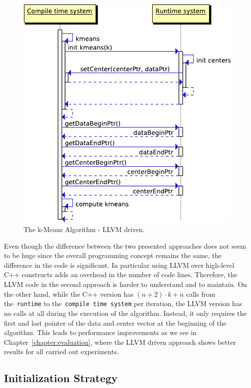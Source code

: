 \begin{figure}[htsb]
  \centering
  \includegraphics[scale=0.55]{figures/llvm_driven}
  \caption[The k-Means Algorithm - LLVM driven]{The k-Means Algorithm - LLVM driven.}
  \label{fig:llvm_driven}
\end{figure}



Even though the difference between the two presented approaches does not seem to be huge since the overall programming concept remains the same, the difference in the code is significant. In particular using LLVM over high-level C++ constructs adds an overhead in the number of code lines. Therefore, the LLVM code in the second approach is harder to understand and to maintain. On the other hand, while the C++ version has $(n + 2) \cdot k + n$ calls from the~\texttt{runtime} to the~\texttt{compile time system} per iteration, the LLVM version has no calls at all during the execution of the algorithm. Instead, it only requires the first and last pointer of the data and center vector at the beginning of the algorithm. This leads to performance improvements as we see in Chapter~\ref{chapter:evaluation}, where the LLVM driven approach shows better results for all carried out experiments.


\subsection{Initialization Strategy}\label{sub:init}

